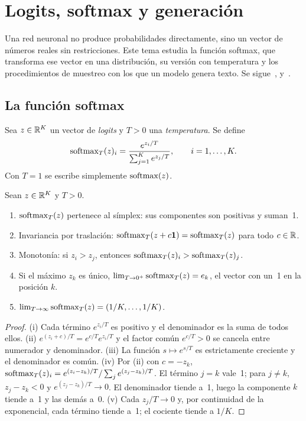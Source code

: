 \chapter{Logits, softmax y generación}
\label{tema:4}

Una red neuronal no produce probabilidades directamente, sino un vector de números reales sin restricciones. Este tema estudia la función softmax, que transforma ese vector en una distribución, su versión con temperatura y los procedimientos de muestreo con los que un modelo genera texto. Se sigue~\cite[§4.1]{d2l}, \cite[§4.1]{gbc} y~\cite[§3.4]{jm3}.

\section{La función softmax}

\begin{definicion}\label{def:softmax}
Sea $z\in\mathbb{R}^{K}$ un vector de \emph{logits} y $T>0$ una \emph{temperatura}. Se define
\[
\operatorname{softmax}_T(z)_i=\frac{e^{z_i/T}}{\sum_{j=1}^{K}e^{z_j/T}},\qquad i=1,\dots,K.
\]
Con $T=1$ se escribe simplemente $\operatorname{softmax}(z)$.
\end{definicion}

\begin{proposicion}[Propiedades]\label{prop:softmax}
Sean $z\in\mathbb{R}^{K}$ y $T>0$.
\begin{enumerate}
  \item $\operatorname{softmax}_T(z)$ pertenece al símplex: sus componentes son positivas y suman~1.
  \item Invariancia por traslación: $\operatorname{softmax}_T(z+c\mathbf{1})=\operatorname{softmax}_T(z)$ para todo $c\in\mathbb{R}$.
  \item Monotonía: si $z_i>z_j$, entonces $\operatorname{softmax}_T(z)_i>\operatorname{softmax}_T(z)_j$.
  \item Si el máximo $z_k$ es único, $\lim_{T\to 0^{+}}\operatorname{softmax}_T(z)=e_k$, el vector con un~1 en la posición $k$.
  \item $\lim_{T\to\infty}\operatorname{softmax}_T(z)=(1/K,\dots,1/K)$.
\end{enumerate}
\end{proposicion}

\begin{proof}
(i) Cada término $e^{z_i/T}$ es positivo y el denominador es la suma de todos ellos. (ii) $e^{(z_i+c)/T}=e^{c/T}e^{z_i/T}$ y el factor común $e^{c/T}>0$ se cancela entre numerador y denominador. (iii) La función $s\mapsto e^{s/T}$ es estrictamente creciente y el denominador es común. (iv) Por (ii) con $c=-z_k$, $\operatorname{softmax}_T(z)_i=e^{(z_i-z_k)/T}/\sum_j e^{(z_j-z_k)/T}$. El término $j=k$ vale~1; para $j\ne k$, $z_j-z_k<0$ y $e^{(z_j-z_k)/T}\to 0$. El denominador tiende a~1, luego la componente $k$ tiende a~1 y las demás a~0. (v) Cada $z_j/T\to 0$ y, por continuidad de la exponencial, cada término tiende a~1; el cociente tiende a $1/K$.
\end{proof}

